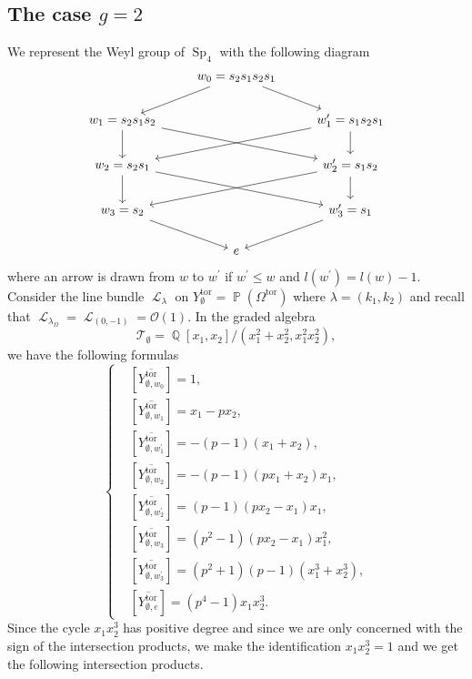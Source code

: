 \documentclass[11pt]{amsart}
\numberwithin{subsection}{section}
\numberwithin{figure}{section}
\numberwithin{table}{section}
\theoremstyle{1}
\theoremstyle{2}
\DeclareMathOperator{\Q}{\mathbb{Q}}
\DeclareMathOperator{\Sp}{Sp}
\DeclareMathOperator{\tor}{tor}
\DeclareMathOperator{\Lc}{\mathcal{L}}
\DeclareMathOperator{\Pb}{\mathbb{P}}
\begin{document}
\subsection{The case $g = 2$}
We represent the Weyl group of $\Sp_4$ with the following diagram
\begin{equation*}
\begin{tikzcd}
& w_0 = s_2s_1s_2s_1 \arrow[ld] \arrow[rd] & \\
w_1 = s_2s_1s_2 \arrow[d] \arrow[rrd] & & w_1^{\prime} = s_1s_2s_1 \arrow[d] \arrow[lld]\\
w_2 =  s_2s_1 \arrow[d] \arrow[rrd] & & w_2^{\prime} = s_1s_2 \arrow[d] \arrow[lld]\\
w_3 = s_2 \arrow[rd] & & w_3^{\prime} = s_1 \arrow[ld] \\
& e &
\end{tikzcd}
\end{equation*}
where an arrow is drawn from $w$ to $w^{\prime}$ if $w^{\prime} \leq w$ and $l(w^\prime) = l(w)-1$. Consider the line bundle $\Lc_{\lambda}$ on $Y^{\tor}_{\emptyset} = \Pb(\Omega^{\tor})$ where $\lambda = (k_1,k_2)$ and recall that $\Lc_{\lambda_{\Omega}} = \Lc_{(0,-1)} = \mathcal{O}(1)$. In the graded algebra $$\mathcal{T}_{\emptyset} = \Q[x_1,x_2]/(x_1^2+x_2^2,x_1^2x_2^2),$$ we have the following formulas
\begin{equation*}
\left\{
\begin{aligned}
&[\overline{Y^{\tor}_{\emptyset, w_0}}] = 1, \\
&[\overline{Y^{\tor}_{\emptyset, w_1}}] = x_1-px_2, \\
&[\overline{Y^{\tor}_{\emptyset,w_1^\prime}}] = -(p-1)(x_1+x_2), \\
&[\overline{Y^{\tor}_{\emptyset,w_2}}] = -(p-1)(px_1+x_2)x_1, \\
&[\overline{Y^{\tor}_{\emptyset,w_2^\prime}}] = (p-1)(px_2-x_1)x_1, \\
&[\overline{Y^{\tor}_{\emptyset,w_3}}] = (p^2-1)(px_2-x_1)x_1^2, \\
&[\overline{Y^{\tor}_{\emptyset,w_3^\prime}}] = (p^2+1)(p-1)(x_1^3+x_2^3),\\
&[\overline{Y^{\tor}_{\emptyset,e}}] = (p^4-1)x_1x_2^3.
\end{aligned}
\right.
\end{equation*}
Since the cycle $x_1x_2^3$ has positive degree and since we are only concerned with the sign of the intersection products, we make the identification $x_1x_2^3 = 1$ and we get the following intersection products.
\end{document}
